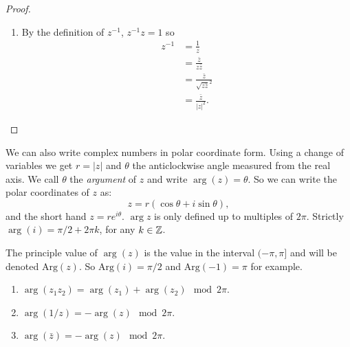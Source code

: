 \documentclass[10pt, a4paper]{article}
\begin{document}
\begin{lemma}
\begin{proof}
\begin{enumerate}[label = \arabic*.]
            \item
            By the definition of $z ^ {-1}$,
            $z ^ {-1}z = 1$ so
            \begin{align*}
                z ^ {-1} &= \frac{1}{z} \\
                &= \frac{\bar{z}}{z\bar{z}} \\
                &= \frac{\bar{z}}{\sqrt{z\bar{z}} ^ 2} \\
                &= \frac{\bar{z}}{|z| ^ 2}.
            \end{align*}
        \end{enumerate}
    \end{proof}
\end{lemma}

We can also write complex numbers in polar coordinate form.
Using a change of variables we get $r = |z|$ and $\theta$ the anticlockwise angle measured from the real axis.
We call $\theta$ the \textit{argument} of $z$ and write $\arg(z) = \theta$.
So we can write the polar coordinates of $z$ as:
\[
z = r(\cos{\theta} + i\sin{\theta}),
\]
and the short hand $z = re ^ {i\theta}$.
$\arg{z}$ is only defined up to multiples of $2\pi$.
Strictly $\arg(i) = \pi / 2 + 2\pi k$,
for any $k \in \mathbb{Z}$.

The principle value of $\arg(z)$ is the value in the interval $(-\pi, \pi]$ and will be denoted $\mathrm{Arg}(z)$.
So $\mathrm{Arg}(i) = \pi / 2$ and $\mathrm{Arg}(-1) = \pi$ for example.

\begin{lemma}
    \begin{enumerate}[label = \arabic*.]
        \item $\arg(z_1z_2) = \arg(z_1) + \arg(z_2)\mod{2\pi}$.
        
        \item $\arg(1 / z) = -\arg(z)\mod{2\pi}$.
        
        \item $\arg(\bar{z}) = -\arg(z)\mod{2\pi}$.
    \end{enumerate}
\end{lemma}
\end{document}
